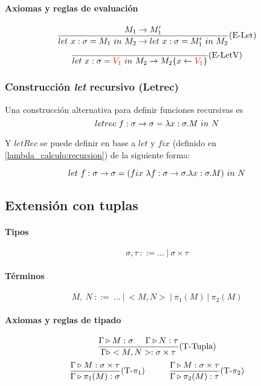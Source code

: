\paragraph{Axiomas y reglas de evaluación}

\begin{equation*}
\frac{M_1\to M_1'}{let~x:\sigma = M_1~in~M_2\to let~x:\sigma = M'_1~in~M_2}(\text{E-Let})
\end{equation*}
\vspace*{5mm}
\begin{equation*}
\frac{}{let~x:\sigma = \color{red}V_1\color{black}~in~M_2\to M_2\{x\leftarrow\color{red}V_1\color{black}\}}(\text{E-LetV})
\end{equation*}

\subsubsection{Construcción \textit{let} recursivo (Letrec)}
Una construcción alternativa para definir funciones recursivas es 
$$letrec~f:\sigma\to\sigma = \lambda x: \sigma . M~in~N$$

Y $letRec$ se puede definir  en base a $let$ y $fix$ (definido en \ref{lambda_calculo:recursion}) de la siguiente forma:

$$let~f:\sigma\to\sigma = (fix~\lambda f: \sigma\to\sigma . \lambda x: \sigma . M)~in~N$$

\subsection{Extensión con tuplas}

\paragraph{Tipos}
$$\sigma,\tau~::= \dots~|~\sigma\times\tau$$

\paragraph{Términos}
$$M,~N~::=~\dots~|~<M,N>~|~\pi_1(M)~|~\pi_2(M)$$
\paragraph{Axiomas y reglas de tipado}
\begin{equation*}
    \frac{\Gamma\triangleright M : \sigma\hspace*{5mm}\Gamma\triangleright N : \tau}{\Gamma\triangleright <M,N> : \sigma\times\tau}(\text{T-Tupla})
\end{equation*}
\vspace*{5mm}
\begin{equation*}
\frac{\Gamma\triangleright M : \sigma\times\tau}{\Gamma\triangleright \pi_1(M) : \sigma}(\text{T-}\pi_1)\hspace*{1cm}\frac{\Gamma\triangleright M : \sigma\times\tau}{\Gamma\triangleright \pi_2(M) : \tau}(\text{T-}\pi_2)
\end{equation*}

